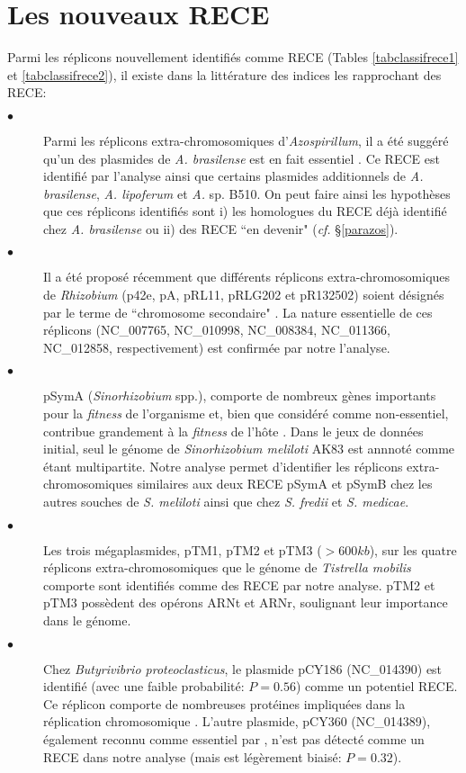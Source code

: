 \section{Les nouveaux RECE}\label{neorece}
	Parmi les réplicons nouvellement identifiés comme RECE (Tables \ref{tabclassifrece1} et \ref{tabclassifrece2}), il existe dans la littérature des indices les rapprochant des RECE:
\begin{description} 	  
	\item[$\bullet$] Parmi les réplicons extra-chromosomiques d'\textit{Azospirillum}, il a été suggéré qu'un des plasmides de \textit{A. brasilense} est en fait essentiel \citep{Acosta-Cruz2012}. Ce RECE est identifié par l'analyse ainsi que certains plasmides additionnels de \textit{A. brasilense}, \textit{A. lipoferum} et \textit{A.} sp. B510. On peut faire ainsi les hypothèses que ces réplicons identifiés sont i) les homologues du RECE déjà identifié chez \textit{A. brasilense} ou ii) des RECE ``en devenir" (\textit{cf.} \S \ref{parazos}).
	\item[$\bullet$] Il a été proposé récemment que différents réplicons extra-chromosomiques de \textit{Rhizobium} (p42e, pA, pRL11, pRLG202 et pR132502) soient désignés par le terme de ``chromosome secondaire" \citep{Landeta2011,Villasenor2011}. La nature essentielle de ces réplicons (NC\_007765, NC\_010998, NC\_008384, NC\_011366, NC\_012858, respectivement) est confirmée par notre l'analyse. 
	\item[$\bullet$] pSymA (\textit{Sinorhizobium} spp.), comporte de nombreux gènes importants pour la \textit{fitness} de l'organisme \citep{blanca2010psyma} et, bien que considéré comme non-essentiel, contribue grandement à la \textit{fitness} de l'hôte \citep{galardini2013replicon}. Dans le jeux de données initial, seul le génome de \textit{Sinorhizobium meliloti} AK83 est annnoté comme étant multipartite. Notre analyse permet d'identifier les réplicons extra-chromosomiques similaires aux deux RECE pSymA et pSymB chez les autres souches de \textit{S. meliloti} ainsi que chez \textit{S. fredii} et \textit{S. medicae}.
	\item[$\bullet$] Les trois mégaplasmides, pTM1, pTM2 et pTM3 ($>600 kb$), sur les quatre réplicons extra-chromosomiques que le génome de \textit{Tistrella mobilis} comporte sont identifiés comme des RECE par notre analyse. pTM2 et pTM3 possèdent des opérons ARNt et ARNr, soulignant leur importance dans le génome.
	\item[$\bullet$] Chez \textit{Butyrivibrio proteoclasticus}, le plasmide pCY186 (NC\_014390) est identifié (avec une faible probabilité: $P=0.56$) comme un potentiel RECE. Ce réplicon comporte de nombreuses protéines impliquées dans la réplication chromosomique \citep{Yeoman2011}. L'autre plasmide, pCY360 (NC\_014389), également reconnu comme essentiel par \cite{Yeoman2011}, n'est pas détecté comme un RECE dans notre analyse (mais est légèrement biaisé: $P=0.32$).

\end{description}
